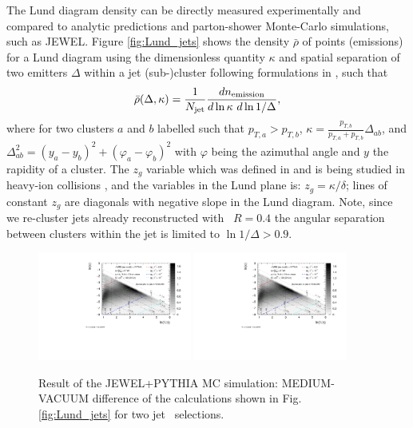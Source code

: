 The Lund diagram density can be directly measured experimentally and compared to analytic predictions and parton-shower Monte-Carlo simulations, such as JEWEL.
Figure \ref{fig:Lund_jets} shows the density $\bar{\rho}$ of points (emissions) for a Lund diagram using the dimensionless quantity $\kappa$ and spatial separation of two emitters $\Delta$ within a jet (sub-)cluster following formulations in \cite{Dreyer:2018nbf}, such that
\begin{equation}
\bar{\rho}(\Delta, \kappa) = \frac{1}{N_{\rm jet}} \frac{dn_{\rm emission}}{d \ln \kappa~d \ln 1/\Delta},
\end{equation}
where for two clusters $a$ and $b$ labelled such that $p_{T,a} > p_{T,b}$, $\kappa=\frac{p_{T,b}}{p_{T,a} + p_{T,b}}\Delta_{ab}$, and $\Delta_{ab}^{2} = (y_a - y_b)^2 + (\varphi_a - \varphi_b)^2$ with $\varphi$ being the azimuthal angle and $y$ the rapidity of a cluster.
The $z_{g}$ variable which was defined in \cite{Larkoski:2017bvj} and is being studied in heavy-ion collisions \cite{Sirunyan:2017bsd}, and the variables in the Lund plane is: $z_{g} = \kappa/\delta$; lines of constant $z_g$ are diagonals with negative slope in the Lund diagram.
Note, since we re-cluster jets already reconstructed with \akt\ $R=0.4$ the angular separation between clusters within the jet is limited to $\ln 1/\Delta > 0.9$.

\begin{figure}[htbp]
	\centering
	\includegraphics[width=0.45\textwidth,page=3]{figures/lund/lund_t}
	\includegraphics[width=0.45\textwidth,page=6]{figures/lund/lund_t}
	\caption{Result of the JEWEL+PYTHIA MC simulation: MEDIUM-VACUUM difference of the calculations shown in Fig. \ref{fig:Lund_jets} for two jet \pt\ selections.}
	\label{fig:Lund_jets_vac_med}
\end{figure}

